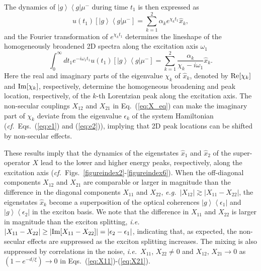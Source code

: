 \documentclass[%
 reprint,%
 amssymb, amsmath,%
 aip,cha,%
]{revtex4-1}
\newcommand{\bra}[1]{\ensuremath{\left\langle{#1}\right\vert}}
\newcommand{\ket}[1]{\ensuremath{\left|{#1}\right\rangle}}
\newcommand{\abs}[1]{\left|#1\right|}
\begin{document}
The dynamics of $\ket{g}\bra{g}\mu^{-}$ during time $t_1$ is then expressed as
\begin{equation}
	u(t_1)[\ket{g}\bra{g}\mu^{-}]=\sum_{k=1}^{2}\alpha_{k}e^{\chi_{k}t_1}\hat{x}_{k},
	\label{eq:gecoh}
\end{equation}
and the Fourier transformation of $e^{\chi_{k}t_1}$ determines the lineshape of the homogeneously broadened 2D spectra along the excitation axis $\omega_1$
\begin{equation}
	\int_{0}^{\infty}dt_1 e^{-i\omega_1 t_1}u(t_1)[\ket{g}\bra{g}\mu^{-}]=\sum_{k=1}^{2}\frac{\alpha_{k}}{\chi_{k}-i\omega_1}\hat{x}_{k}.
\end{equation}
Here the real and imaginary parts of the eigenvalue $\chi_{k}$ of $\hat{x}_k$, denoted by ${\rm Re}[\chi_{k}]$ and ${\rm Im}[\chi_{k}]$, respectively, determine the homogeneous broadening and peak location, respectively, of the $k$-th Lorentzian peak along the excitation axis. The non-secular couplings $X_{12}$ and $X_{21}$ in Eq.~(\ref{eq:X_eq}) can make the imaginary part of $\chi_k$ deviate from the eigenvalue $\epsilon_k$ of the system Hamiltonian ({\it cf.}~Eqs.~(\ref{eq:e1}) and (\ref{eq:e2})), implying that 2D peak locations can be shifted by non-secular effects.

These results imply that the dynamics of the eigenstates $\hat{x}_1$ and $\hat{x}_2$ of the super-operator $X$ lead to the lower and higher energy peaks, respectively, along the excitation axis ({\it cf.}~Figs.~\ref{figureindex2}-\ref{figureindex6}). When the off-diagonal components $X_{12}$ and $X_{21}$ are comparable or larger in magnitude than the difference in the diagonal components $X_{11}$ and $X_{22}$, {\it e.g.}~$\abs{X_{12}}\gtrsim\abs{X_{11}-X_{22}}$, the eigenstates $\hat{x}_k$ become a superposition of the optical coherences $\ket{g}\bra{\epsilon_1}$ and $\ket{g}\bra{\epsilon_2}$ in the exciton basis. We note that the difference in $X_{11}$ and $X_{22}$ is larger in magnitude than the exciton splitting, {\it i.e.}~$\abs{X_{11}-X_{22}}\ge\abs{{\rm Im}[X_{11}-X_{22}]}=\abs{\epsilon_2-\epsilon_1}$, indicating that, as expected, the non-secular effects are suppressed as the exciton splitting increases. The mixing is also suppressed by correlations in the noise, {\it i.e.}~$X_{11}$, $X_{22} \neq 0$ and $X_{12}$, $X_{21}\rightarrow0$ as $\left(1-e^{-d/\xi}\right)\rightarrow 0$ in Eqs.~(\ref{eq:X11})-(\ref{eq:X21}).
\end{document}
